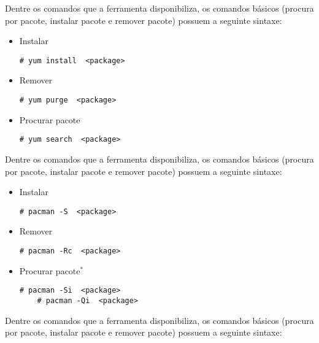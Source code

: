 \label{sub:yum}

Dentre os comandos que a ferramenta disponibiliza, os comandos básicos (procura por pacote, instalar pacote e remover pacote) possuem a seguinte sintaxe:

\begin{itemize}
	\item Instalar
	\begin{lstlisting}[numbers=none,commentstyle=\color{black}]
	# yum install  <package>
	\end{lstlisting}
	\item Remover
	\begin{lstlisting}[numbers=none,commentstyle=\color{black}]
	# yum purge  <package>
	\end{lstlisting}
	\item Procurar pacote
	\begin{lstlisting}[numbers=none,commentstyle=\color{black}]
	# yum search  <package>
	\end{lstlisting}
\end{itemize}


\label{sub:pacan}

Dentre os comandos que a ferramenta disponibiliza, os comandos básicos (procura por pacote, instalar pacote e remover pacote) possuem a seguinte sintaxe:

\begin{itemize}
	\item Instalar
	\begin{lstlisting}[numbers=none,commentstyle=\color{black}]
	# pacman -S  <package>
	\end{lstlisting}
	\item Remover
	\begin{lstlisting}[numbers=none,commentstyle=\color{black}]
	# pacman -Rc  <package>
	\end{lstlisting}
	\item Procurar pacote$^*$
	\begin{lstlisting}[numbers=none,commentstyle=\color{black}]
	# pacman -Si  <package>
	# pacman -Qi  <package>
	\end{lstlisting}
\end{itemize}


\label{sub:zypper}

Dentre os comandos que a ferramenta disponibiliza, os comandos básicos (procura por pacote, instalar pacote e remover pacote) possuem a seguinte sintaxe:

